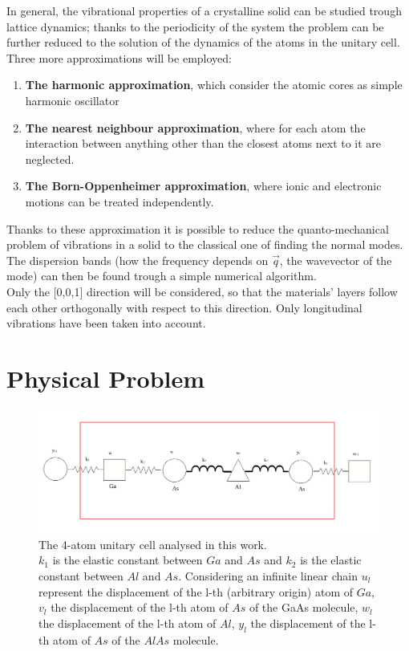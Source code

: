 \documentclass{article}
\begin{document}
In general, the vibrational properties of a crystalline solid can be studied trough lattice dynamics; thanks to the periodicity of the system the problem can be further reduced to the solution of the dynamics of the atoms in the unitary cell.\\
	Three more approximations will be employed:
	\begin{enumerate}
		\item \textbf{The harmonic approximation}, which consider the atomic cores as simple harmonic oscillator
		\item \textbf{The nearest neighbour approximation}, where for each atom the interaction between anything other than the closest atoms next to it are neglected.
		\item \textbf{The Born-Oppenheimer approximation}, where ionic and electronic motions can be treated independently.
	\end{enumerate}
	Thanks to these approximation it is possible to reduce the quanto-mechanical problem of vibrations in a solid to the classical one of finding the normal modes. The dispersion bands (how the frequency depends on $\vec{q}$, the wavevector of the mode) can then be found trough a simple numerical algorithm.\\
Only the [0,0,1] direction will be considered, so that the materials' layers follow each other orthogonally with respect to this direction. Only longitudinal vibrations have been taken into account. \\

	\section{Physical Problem}

\begin{figure}
	\centering
	\includegraphics[width=0.7\linewidth]{cella.png}
	\caption{The 4-atom unitary cell analysed in this work.\\
	$k_1$ is the elastic constant between $Ga$ and $As$ and $k_2$ is the elastic constant between $Al$ and $As$. Considering an infinite linear chain $u_l$ represent the displacement of the l-th (arbitrary origin) atom of $Ga$, $v_l$ the displacement of the l-th atom of $As$ of the GaAs molecule, $w_l$ the displacement of the l-th atom of $Al$, $y_l$ the displacement of the l-th atom of $As$ of the $AlAs$ molecule.   }
	\label{fig:cella}
\end{figure}
\end{document}
